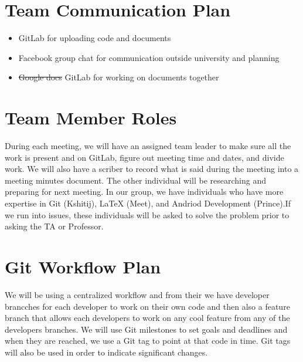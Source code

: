 \documentclass{article}
\begin{document}
\section{Team Communication Plan}
 \begin{itemize}
 \item {\color{red}GitLab} for uploading code and documents
 \item Facebook group chat for communication outside university and planning 
 \item \sout{Google docs} {\color{red}GitLab} for working on documents together 
\end{itemize}

\section{Team Member Roles}
During each meeting, we will have an assigned team leader to make sure all the work is present and on {\color{red} GitLab}, figure out meeting time and dates, and divide work. We will also have a {\color{red} scriber} to record what is said during the meeting into a meeting minutes document. The other individual will be researching and preparing for next meeting. In our group, we have individuals who have more expertise in {\color{red} Git} {\color{red} (Kshitij)}, LaTeX {\color{red}
(Meet)}, and Andriod Development {\color{red} (Prince)}.If we run into issues, these individuals will be asked to solve the problem prior to asking the TA or Professor. 

\section{Git Workflow Plan}
We will be using a centralized workflow and from their we have developer brancches for each developer to work on their own code and then also a feature branch that allows each developers to work on any cool feature from any of the developers branches. We will use {\color{red} Git} milestones to set goals and deadlines and when they are reached, we use a {\color{red} Git} {\color{red} tag} to point at that code in time. Git {\color{red} tags} will also be used in order to indicate significant changes.  
\end{document}
